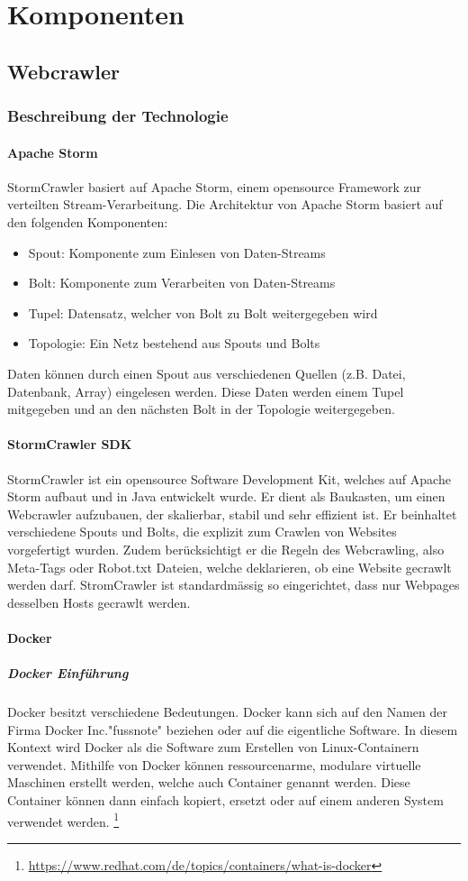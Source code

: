 \chapter{Komponenten}
\section{Webcrawler}
\subsection{Beschreibung der Technologie}
\subsubsection{Apache Storm}
StormCrawler basiert auf Apache Storm, einem opensource Framework zur verteilten Stream-Verarbeitung.
Die Architektur von Apache Storm basiert auf den folgenden Komponenten:
\begin{itemize}
	\item Spout: Komponente zum Einlesen von Daten-Streams
	\item Bolt: Komponente zum Verarbeiten von Daten-Streams
	\item Tupel: Datensatz, welcher von Bolt zu Bolt weitergegeben wird
	\item Topologie: Ein Netz bestehend aus Spouts und Bolts
\end{itemize}
Daten können durch einen Spout aus verschiedenen Quellen (z.B. Datei, Datenbank, Array) eingelesen werden.
Diese Daten werden einem Tupel mitgegeben und an den nächsten Bolt in der Topologie weitergegeben.
\subsubsection{StormCrawler SDK}
StormCrawler ist ein opensource Software Development Kit, welches auf Apache Storm aufbaut und in Java entwickelt wurde.
Er dient als Baukasten, um einen Webcrawler aufzubauen, der skalierbar, stabil und sehr effizient ist.
Er beinhaltet verschiedene Spouts und Bolts, die explizit zum Crawlen von Websites vorgefertigt wurden.
Zudem berücksichtigt er die Regeln des Webcrawling, also Meta-Tags oder Robot.txt Dateien, welche deklarieren, ob eine Website gecrawlt werden darf.
StromCrawler ist standardmässig so eingerichtet, dass nur Webpages desselben Hosts gecrawlt werden.
\subsubsection{Docker}
\paragraph{Docker Einführung}
Docker besitzt verschiedene Bedeutungen. Docker kann sich auf den Namen der Firma Docker Inc."fussnote" beziehen oder auf die eigentliche Software.
In diesem Kontext wird Docker als die Software zum Erstellen von Linux-Containern verwendet.
Mithilfe von Docker können ressourcenarme, modulare virtuelle Maschinen erstellt werden, welche auch Container genannt werden.
Diese Container können dann einfach kopiert, ersetzt oder auf einem anderen System verwendet werden.
\footnote{\url{https://www.redhat.com/de/topics/containers/what-is-docker}}

